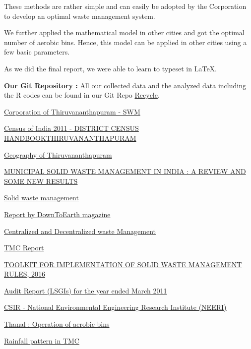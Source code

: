 \documentclass[12pt,a4paper]{report}
\begin{document}
These methods are rather simple and can easily be adopted by the Corporation to develop an optimal waste management system.

We further applied the mathematical model in other cities and got the optimal number of aerobic bins. Hence, this model can be applied in other cities using a few basic parameters. 

As we did the final report, we were able to learn to typeset in \LaTeX.

\textbf{Our Git Repository :} All our collected data and the analyzed data including the R codes can be found in our Git Repo \href{https://github.com/sahridhaya/Recycle}{Recycle}.

\begin{thebibliography}{}
	
\href{http://www.corporationoftrivandrum.in/solid-waste-management-0}{Corporation of Thiruvananthapuram - SWM}

 \href{http://censusindia.gov.in/2011census/dchb/3214_PART_B_THIRUVANANTHAPURAM.pdf}{Census of India 2011 - DISTRICT CENSUS HANDBOOKTHIRUVANANTHAPURAM}	

\href{https://en.wikipedia.org/wiki/Geography_of_Thiruvananthapuram}{Geography of Thiruvananthapuram}

 \href{https://www.researchgate.net/publication/260230170_MUNICIPAL_SOLID_WASTE_MANAGEMENT_IN_INDIA_A_REVIEW_AND_SOME_NEW_RESULTS}{MUNICIPAL SOLID WASTE MANAGEMENT IN INDIA : A REVIEW AND SOME NEW RESULTS} 

 \href{https://www.cag.org.in/blogs/solid-waste-management-dummies}{Solid waste management}

 \href{https://www.downtoearth.org.in/blog/waste/india-s-challenges-in-waste-management-56753}{Report by DownToEarth magazine}

 \href{https://www.cag.org.in/database/centralised-and-decentralised-waste-management}{Centralized and Decentralized waste Management }

 \href{http://www.corporationoftrivandrum.in/sites/default/files/Rating\%20report-TVM.pdf}{TMC Report}

\href{http://www.npcindia.gov.in/wp-content/uploads/2017/11/Guidelines-of-implementation-for-SWM-Rules-2016.pdf}{TOOLKIT FOR IMPLEMENTATION OF SOLID WASTE MANAGEMENT RULES, 2016}

\href{https://www.agker.cag.gov.in/images/LSG2011/chiiib.pdf}{Audit Report (LSGIs) for the year ended March 2011}

\href{http://www.neeri.res.in/content/annual-reports-0}{CSIR - National Environmental Engineering Research Institute (NEERI)}

\href{http://thanal.co.in/uploads/resource/document/standard-operating-procedure-of-community-aerobic-composting-bins-thumburmoozhi-model-44732514.pdf}{Thanal : Operation of aerobic bins}

\href{http://www.kerala.climatemps.com/}{Rainfall pattern in TMC}

\end{thebibliography}
\end{document}
